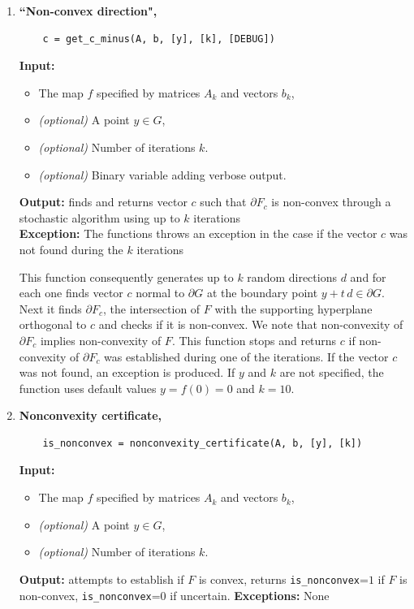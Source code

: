 \documentclass[a4paper]{article}
\theoremstyle{definition}
\begin{document}
\begin{enumerate}
\item {\bf ``Non-convex direction",\hskip 6pt} 
	\begin{verbatim}
	c = get_c_minus(A, b, [y], [k], [DEBUG])
	\end{verbatim}
{\bf Input:}
\begin{itemize}
	\item The map $f$ specified by matrices $A_k$ and vectors $b_k$,
	\item {\it (optional)} A point $y\in G$,
	\item {\it (optional)} Number of iterations $k$.
	\item {\it (optional)} Binary variable adding verbose output.
\end{itemize}
{\bf Output:}  finds and returns vector $c$ such that $\partial F_c$ is non-convex through a stochastic algorithm using up to $k$ iterations\\
{\bf Exception:} The functions throws an exception in the case if the vector $c$ was not found during the $k$ iterations

This function consequently generates up to $k$ random directions $d$ and for each one finds vector $c$ normal to $\partial G$ at the boundary point $y+t\, d\in \partial G$.
Next it finds $\partial F_c$, the intersection of $F$ with the supporting hyperplane orthogonal to $c$ and checks if it is non-convex.
We note that non-convexity of $\partial F_c$ implies non-convexity of $F$.
This function stops and returns $c$ if non-convexity of $\partial F_c$ was established during one of the iterations. If the vector $c$ was not found, an exception is produced.
If $y$ and $k$ are not specified, the function uses default values $y=f(0)=0$ and $k=10$.


\item {\bf Nonconvexity certificate,\hskip 6pt} 
	\begin{verbatim}
	is_nonconvex = nonconvexity_certificate(A, b, [y], [k])
	\end{verbatim}
{\bf Input:}
\begin{itemize}
	\item The map $f$ specified by matrices $A_k$ and vectors $b_k$,
	\item {\it (optional)} A point $y\in G$,
	\item {\it (optional)} Number of iterations $k$.
\end{itemize}
{\bf Output:} attempts to establish if $F$ is convex, returns {\tt is\_nonconvex}=$1$ if $F$ is non-convex,  {\tt is\_nonconvex}=$0$ if uncertain.
{\bf Exceptions:} None


\end{enumerate}
\end{document}
